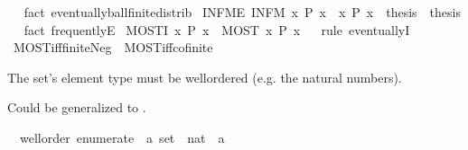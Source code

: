 \begin{isabellebody}
\isadelimproof
\ %
\endisadelimproof
%
\isatagproof
{}\isamarkupfalse%
\ {\isacharparenleft}fact\ eventually{\isacharunderscore}ball{\isacharunderscore}finite{\isacharunderscore}distrib{\isacharparenright}%
\endisatagproof
{\isafoldproof}%
%
\isadelimproof
%
\endisadelimproof
\isanewline
{}\isamarkupfalse%
\ INFM{\isacharunderscore}E{\isacharcolon}\ {\isachardoublequoteopen}INFM\ x{\isachardot}\ P\ x\ {\isasymLongrightarrow}\ {\isacharparenleft}{\isasymAnd}x{\isachardot}\ P\ x\ {\isasymLongrightarrow}\ thesis{\isacharparenright}\ {\isasymLongrightarrow}\ thesis{\isachardoublequoteclose}%
\isadelimproof
\ %
\endisadelimproof
%
\isatagproof
{}\isamarkupfalse%
\ {\isacharparenleft}fact\ frequentlyE{\isacharparenright}%
\endisatagproof
{\isafoldproof}%
%
\isadelimproof
%
\endisadelimproof
\isanewline
{}\isamarkupfalse%
\ MOST{\isacharunderscore}I{\isacharcolon}\ {\isachardoublequoteopen}{\isacharparenleft}{\isasymAnd}x{\isachardot}\ P\ x{\isacharparenright}\ {\isasymLongrightarrow}\ MOST\ x{\isachardot}\ P\ x{\isachardoublequoteclose}%
\isadelimproof
\ %
\endisadelimproof
%
\isatagproof
{}\isamarkupfalse%
\ {\isacharparenleft}rule\ eventuallyI{\isacharparenright}%
\endisatagproof
{\isafoldproof}%
%
\isadelimproof
%
\endisadelimproof
\isanewline
{}\isamarkupfalse%
\ MOST{\isacharunderscore}iff{\isacharunderscore}finiteNeg\ {\isacharequal}\ MOST{\isacharunderscore}iff{\isacharunderscore}cofinite%
\isadelimdocument
%
\endisadelimdocument
%
\isatagdocument
%
\isamarkuptrue%
%
\endisatagdocument
{\isafolddocument}%
%
\isadelimdocument
%
\endisadelimdocument
%
\begin{isamarkuptext}%
The set's element type must be wellordered (e.g. the natural numbers).%
\end{isamarkuptext}\isamarkuptrue%
%
\begin{isamarkuptext}%
Could be generalized to
    .%
\end{isamarkuptext}\isamarkuptrue%
\isamarkupfalse%
\ {\isacharparenleft}\ wellorder{\isacharparenright}\ enumerate\ {\isacharcolon}{\isacharcolon}\ {\isachardoublequoteopen}{\isacharprime}a\ set\ {\isasymRightarrow}\ nat\ {\isasymRightarrow}\ {\isacharprime}a{\isachardoublequoteclose}\isanewline

\end{isabellebody}
